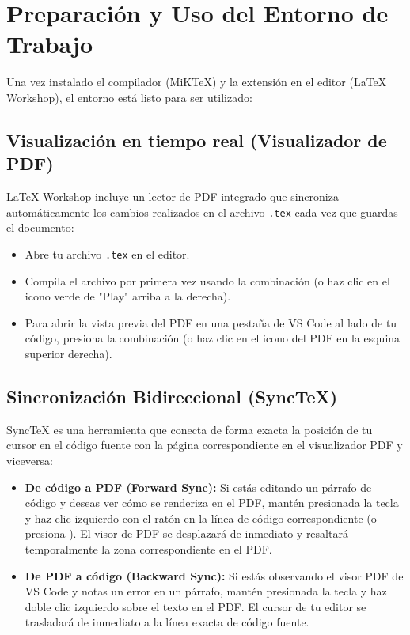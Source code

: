 \documentclass[
10pt, %
a4paper, %
oneside, %
headinclude,footinclude, %
BCOR5mm, %
]{scrartcl}
\begin{document}
\newpage
\section{Preparación y Uso del Entorno de Trabajo}

Una vez instalado el compilador (MiKTeX) y la extensión en el editor (LaTeX Workshop), el entorno está listo para ser utilizado:

\subsection{Visualización en tiempo real (Visualizador de PDF)}
LaTeX Workshop incluye un lector de PDF integrado que sincroniza automáticamente los cambios realizados en el archivo \texttt{.tex} cada vez que guardas el documento:
\begin{itemize}
	\item Abre tu archivo \texttt{.tex} en el editor.
	\item Compila el archivo por primera vez usando la combinación  (o haz clic en el icono verde de "Play" arriba a la derecha).
	\item Para abrir la vista previa del PDF en una pestaña de VS Code al lado de tu código, presiona la combinación  (o haz clic en el icono del PDF en la esquina superior derecha).
\end{itemize}

\subsection{Sincronización Bidireccional (SyncTeX)}
SyncTeX es una herramienta que conecta de forma exacta la posición de tu cursor en el código fuente con la página correspondiente en el visualizador PDF y viceversa:
\begin{itemize}
	\item \textbf{De código a PDF (Forward Sync):} Si estás editando un párrafo de código y deseas ver cómo se renderiza en el PDF, mantén presionada la tecla  y haz clic izquierdo con el ratón en la línea de código correspondiente (o presiona ). El visor de PDF se desplazará de inmediato y resaltará temporalmente la zona correspondiente en el PDF.
	\item \textbf{De PDF a código (Backward Sync):} Si estás observando el visor PDF de VS Code y notas un error en un párrafo, mantén presionada la tecla  y haz doble clic izquierdo sobre el texto en el PDF. El cursor de tu editor se trasladará de inmediato a la línea exacta de código fuente.
\end{itemize}
\end{document}
